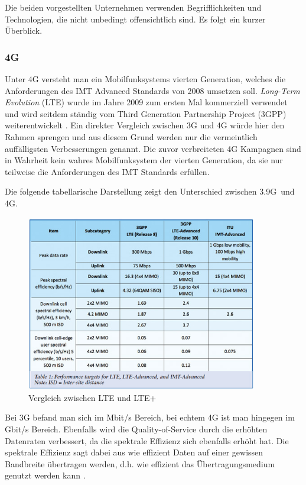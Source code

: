 Die beiden vorgestellten Unternehmen verwenden Begrifflichkeiten und Technologien, die nicht unbedingt offensichtlich sind. Es folgt ein kurzer Überblick. 

\subsubsection{4G}

Unter 4G versteht man ein Mobilfunksystems vierten Generation, welches die Anforderungen des IMT Advanced Standards von 2008 umsetzen soll. \textit{Long-Term Evolution} (LTE) wurde im Jahre 2009 zum ersten Mal kommerziell verwendet und wird seitdem ständig vom Third Generation Partnership Project (3GPP) weiterentwickelt \cite{lte}. Ein direkter Vergleich zwischen 3G und 4G würde hier den Rahmen sprengen und aus diesem Grund werden nur die vermeintlich auffälligsten Verbesserungen genannt. Die zuvor verbreiteten 4G Kampagnen sind in Wahrheit kein wahres Mobilfunksystem der vierten Generation, da sie nur teilweise die Anforderungen des IMT Standards erfüllen.

Die folgende tabellarische Darstellung zeigt den Unterschied zwischen \glqq 3.9G\grqq \ und 4G.

\begin{figure}[H]
\centering
\includegraphics[width=0.9\textwidth]{pictures/lteadv.jpg}
\caption{Vergleich zwischen LTE und LTE+ \cite{ltevergleich}}
\label{fig:lteplus}
\end{figure}

Bei 3G befand man sich im Mbit/s Bereich, bei echtem 4G ist man hingegen im Gbit/s Bereich. Ebenfalls wird die Quality-of-Service durch die erhöhten Datenraten verbessert, da die spektrale Effizienz sich ebenfalls erhöht hat. Die spektrale Effizienz sagt dabei aus wie effizient Daten auf einer gewissen Bandbreite übertragen werden, d.h. wie effizient das Übertragungsmedium genutzt werden kann \cite{ltevergleich}.   

